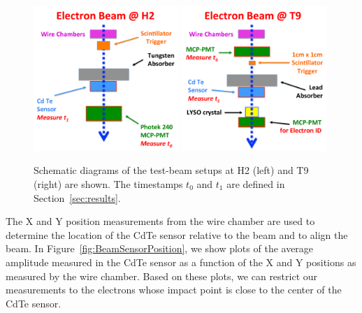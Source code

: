 \begin{figure}[htbp] 
\centering
\includegraphics[width=0.49\textwidth]{figures/H2_BeamSchematicDiagram.pdf} 
\includegraphics[width=0.49\textwidth]{figures/T9_BeamSchematicDiagram.pdf} 
\caption{Schematic diagrams of the test-beam setups at H2 (left) and T9 (right) are shown. 
The timestamps $t_0$ and $t_1$ are defined in Section~\ref{sec:results}.} 
\label{fig:BeamSchematicDiagram} 
\end{figure} 


The X and Y position measurements from the wire chamber are used to determine the location
of the CdTe sensor relative to the beam and to align the beam. In 
Figure~\ref{fig:BeamSensorPosition}, we show plots of the average amplitude measured in the
CdTe sensor as a function of the X and Y positions as measured by the wire chamber. Based
on these plots, we can restrict our measurements to the electrons whose impact point is close
to the center of the CdTe sensor.

